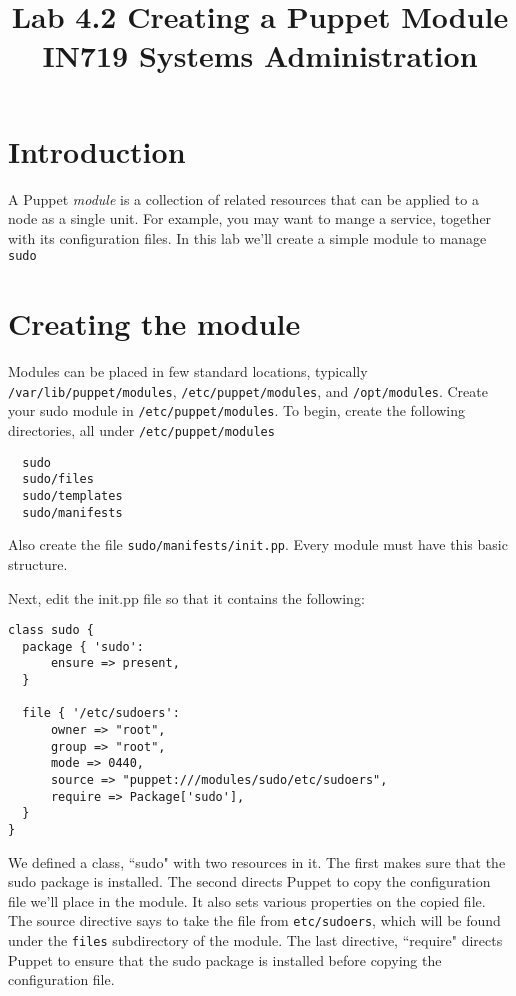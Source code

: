 \documentclass{article}   	%
\title{Lab 4.2 Creating a Puppet Module \\ IN719 Systems Administration}
\date{}
\begin{document}
\maketitle

\section*{Introduction}
A Puppet \emph{module} is a collection of related resources that can be applied to a node as a single unit. For example, you may want to mange a service, together with its configuration files.  In this lab we'll create a simple module to manage \texttt{sudo}

\section*{Creating the module}
Modules can be placed in few standard locations, typically \texttt{/var/lib/puppet/modules}, \texttt{/etc/puppet/modules}, and \texttt{/opt/modules}.  Create your sudo module in \texttt{/etc/puppet/modules}.  To begin, create the following directories, all under \texttt{/etc/puppet/modules}
\begin{verbatim}
  sudo
  sudo/files
  sudo/templates
  sudo/manifests
\end{verbatim}
Also create the file \texttt{sudo/manifests/init.pp}.  Every module must have this basic structure.

Next, edit the init.pp file so that it contains the following:

\newpage

\begin{verbatim}
class sudo {
  package { 'sudo':
      ensure => present,
  }

  file { '/etc/sudoers':
      owner => "root",
      group => "root",
      mode => 0440,
      source => "puppet:///modules/sudo/etc/sudoers",
      require => Package['sudo'],
  }
}
\end{verbatim}

We defined a class, ``sudo" with two resources in it.  The first makes sure that the sudo package is installed.  The second directs Puppet to copy the configuration file we'll place in the module.  It also sets various properties on the copied file.  The source directive says to take the file from \texttt{etc/sudoers}, which will be found under the \texttt{files} subdirectory of the module.  The last directive, ``require" directs Puppet to ensure that the sudo package is installed before copying the configuration file.
\end{document}
